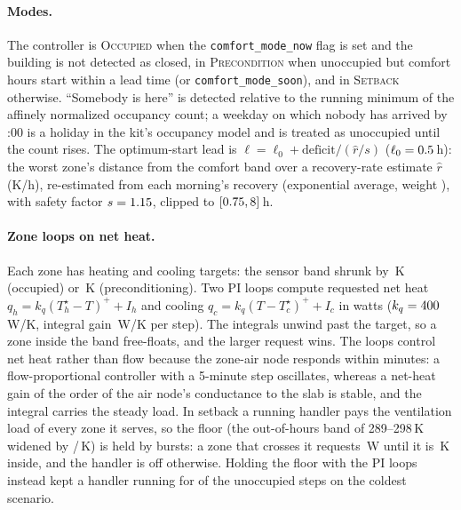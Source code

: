 \documentclass{article}
\begin{document}
\paragraph{Modes.} The controller is \textsc{Occupied} when the \texttt{comfort\_mode\_now} flag is set and the building is not detected as closed, in \textsc{Precondition} when unoccupied but comfort hours start within a lead time (or \texttt{comfort\_mode\_soon}), and in \textsc{Setback} otherwise. ``Somebody is here'' is detected relative to the running minimum of the affinely normalized occupancy count; a weekday on which nobody has arrived by \ParHolidayCheckH{}:00 is a holiday in the kit's occupancy model and is treated as unoccupied until the count rises. The optimum-start lead is $\ell = \ell_0 + \text{deficit}/(\hat{r}/s)$ ($\ell_0 = 0.5$\,h): the worst zone's distance from the comfort band over a recovery-rate estimate $\hat{r}$ (K/h), re-estimated from each morning's recovery (exponential average, weight \ParRateEma), with safety factor $s=1.15$, clipped to $[0.75, 8]$\,h.

\paragraph{Zone loops on net heat.} Each zone has heating and cooling targets: the sensor band shrunk by \ParMarginOcc\,K (occupied) or \ParMarginPre\,K (preconditioning). Two PI loops compute requested net heat $q_h = k_q (T_h^\star - T)^+ + I_h$ and cooling $q_c = k_q (T - T_c^\star)^+ + I_c$ in watts ($k_q = 400$\,W/K, integral gain \ParKiWPerKStep\,W/K per step). The integrals unwind past the target, so a zone inside the band free-floats, and the larger request wins. The loops control net heat rather than flow because the zone-air node responds within minutes: a flow-proportional controller with a 5-minute step oscillates, whereas a net-heat gain of the order of the air node's conductance to the slab is stable, and the integral carries the steady load. In setback a running handler pays the ventilation load of every zone it serves, so the floor (the out-of-hours band of 289--298\,K widened by \ParNightLowExt{}/\ParNightHighExt\,K) is held by bursts: a zone that crosses it requests \ParQSbW\,W until it is \ParSbHystK\,K inside, and the handler is off otherwise. Holding the floor with the PI loops instead kept a handler running for \VthreeAhuOnUnocc{} of the unoccupied steps on the coldest scenario.
\end{document}
